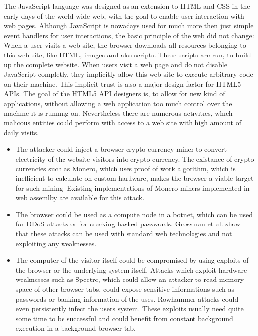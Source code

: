 \documentclass[article,type=bsc,colorback,accentcolor=tud9c]{tudthesis}
\begin{document}
  The JavaScript language was designed as an extension to HTML and CSS in the early days of the world wide web, with the goal to enable user interaction with web pages. Although JavaScript is nowadays used for much more then just simple event handlers for user interactions, the basic principle of the web did not change: When a user visits a web site, the browser downloads all resources belonging to this web site, like HTML, images and also scripts. These scripts are run, to build up the complete website. When users visit a web page and do not disable JavaScript completly, they implicitly allow this web site to execute arbitrary code on their machine. This implicit trust is also a major design factor for HTML5 APIs. The goal of the HTML5 API designers is, to allow for new kind of applications, without allowing a web application too much control over the machine it is running on. Nevertheless there are numerous activities, which malicous entities could perform with access to a web site with high amount of daily visits.

  \begin{itemize}
  \item The attacker could inject a browser crypto-currency miner to convert electricity of the website visitors into crypto currency. The existance of crypto currencies such as Monero, which uses proof of work algorithm, which is inefficient to calculate on custom hardware, makes the browser a viable target for such mining. Existing implementations of Monero miners implemented in web assemlby are available for this attack.
  \item The browser could be used as a compute node in a botnet, which can be used for DDoS attacks or for cracking hashed passwords. Grossman et al.\cite{grossmann2013million} show that these attacks can be used with standard web technologies and not exploiting any weaknesses.
  \item The computer of the visitor itself could be compromised by using exploits of the browser or the underlying system itself. Attacks which exploit hardware weaknesses such as Spectre\cite{Kocher2018spectre}, which could allow an attacker to read memory space of other browser tabs, could expose sensitive informations such as passwords or banking information of the uses. Rowhammer\cite{rowhammer} attacks could even persistently infect the users system. These exploits usually need quite some time to be successful and could benefit from constant background execution in a background browser tab.
  \end{itemize}
\end{document}
